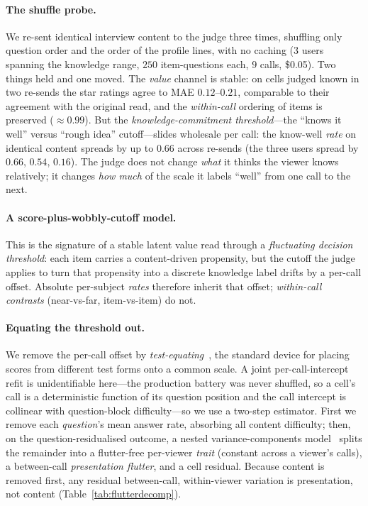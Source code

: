 \documentclass[11pt]{article}
\begin{document}
\paragraph{The shuffle probe.} We re-sent identical interview content to the judge three times, shuffling only
question order and the order of the profile lines, with no caching ($3$ users spanning the knowledge range, $250$
item-questions each, $9$ calls, \$0.05). Two things held and one moved. The \emph{value} channel is stable: on cells
judged known in two re-sends the star ratings agree to MAE $0.12$--$0.21$, comparable to their agreement with the
original read, and the \emph{within-call} ordering of items is preserved ($\approx0.99$). But the
\emph{knowledge-commitment threshold}---the ``knows it well'' versus ``rough idea'' cutoff---slides wholesale per
call: the know-well \emph{rate} on identical content spreads by up to $0.66$ across re-sends (the three users spread
by $0.66$, $0.54$, $0.16$). The judge does not change \emph{what} it thinks the viewer knows relatively; it changes
\emph{how much} of the scale it labels ``well'' from one call to the next.

\paragraph{A score-plus-wobbly-cutoff model.} This is the signature of a stable latent value read through a
\emph{fluctuating decision threshold}: each item carries a content-driven propensity, but the cutoff the judge applies
to turn that propensity into a discrete knowledge label drifts by a per-call offset. Absolute per-subject \emph{rates}
therefore inherit that offset; \emph{within-call contrasts} (near-vs-far, item-vs-item) do not.

\paragraph{Equating the threshold out.} We remove the per-call offset by \emph{test-equating}~\cite{kolen04,lord80},
the standard device for placing scores from different test forms onto a common scale. A joint per-call-intercept refit
is unidentifiable here---the production battery was never shuffled, so a cell's call is a deterministic function of
its question position and the call intercept is collinear with question-block difficulty---so we use a two-step
estimator. First we remove each \emph{question}'s mean answer rate, absorbing all content difficulty; then, on the
question-residualised outcome, a nested variance-components model~\cite{searle92} splits the remainder into a
flutter-free per-viewer \emph{trait} (constant across a viewer's calls), a between-call \emph{presentation flutter},
and a cell residual. Because content is removed first, any residual between-call, within-viewer variation is
presentation, not content (Table~\ref{tab:flutterdecomp}).
\end{document}
